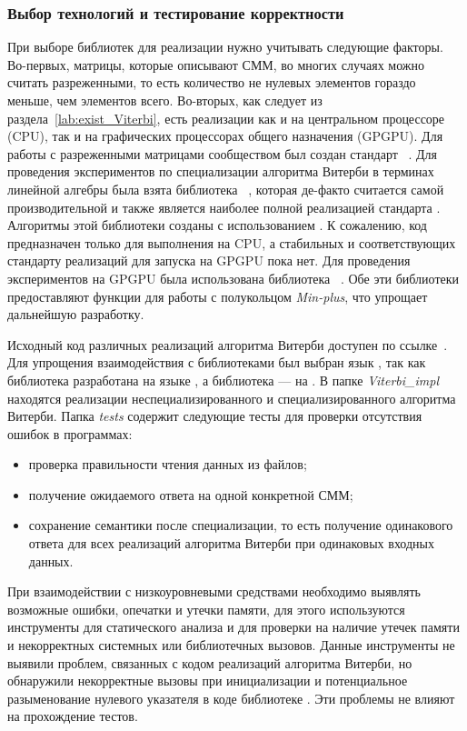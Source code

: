 \subsubsection{Выбор технологий и тестирование корректности}
При выборе библиотек для реализации нужно учитывать следующие 
факторы.
Во-первых, матрицы, которые описывают СММ, во многих случаях 
можно считать разреженными, то есть количество не нулевых 
элементов гораздо меньше, чем элементов всего.
Во-вторых, как следует из раздела~\ref{lab:exist_Viterbi}, 
есть реализации как и на центральном процессоре (CPU), так и 
на графических процессорах общего назначения (GPGPU).
Для работы с разреженными матрицами сообществом был создан 
стандарт ~\cite{GraphBLAS}.
Для проведения экспериментов по специализации алгоритма 
Витерби в терминах линейной алгебры была взята библиотека 
~\cite{SuiteSparse}, 
которая де-факто считается самой производительной и также 
является наиболее полной реализацией стандарта 
.
Алгоритмы этой библиотеки созданы с использованием .
К сожалению, код  
предназначен только для выполнения на CPU, а стабильных и 
соответствующих стандарту  реализаций для 
запуска на GPGPU пока нет.
Для проведения экспериментов на GPGPU была использована 
библиотека ~\cite{CUSP}.
Обе эти библиотеки предоставляют функции для работы с 
полукольцом \emph{Min-plus}, что упрощает дальнейшую 
разработку.

Исходный код различных реализаций алгоритма Витерби доступен 
по ссылке~\cite{repo}.
Для упрощения взаимодействия с библиотеками был выбран язык 
\CPP, так как библиотека  
разработана на языке , а библиотека  --- на \CPP.
В папке \emph{Viterbi\_impl} находятся реализации
неспециализированного и специализированного алгоритма Витерби.
Папка \emph{tests} содержит следующие тесты для проверки 
отсутствия ошибок в программах:
\begin{itemize}
	\item проверка правильности чтения данных из файлов;
	\item получение ожидаемого ответа на одной конкретной СММ;
	\item сохранение семантики после специализации, то есть 
	получение одинакового ответа для всех реализаций 
	алгоритма Витерби при одинаковых входных данных.
\end{itemize} 
При взаимодействии с низкоуровневыми средствами
необходимо выявлять возможные ошибки, опечатки и утечки 
памяти, для этого используются инструменты  
для статического анализа и  для проверки на 
наличие утечек памяти и некорректных системных или 
библиотечных вызовов.
Данные инструменты не выявили проблем, связанных с кодом 
реализаций алгоритма Витерби, но обнаружили некорректные 
вызовы при инициализации  и потенциальное 
разыменование нулевого указателя в коде библиотеке .
Эти проблемы не влияют на прохождение тестов.

